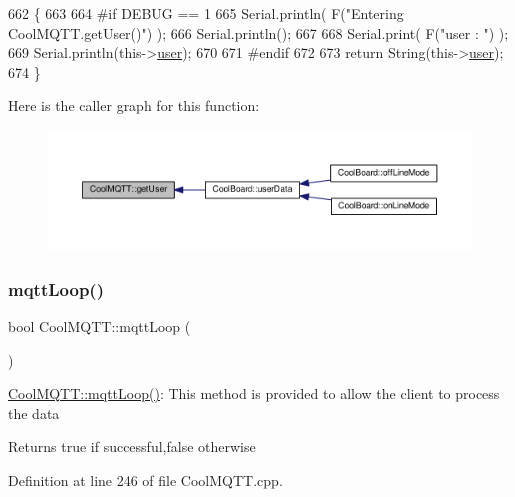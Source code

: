 \begin{DoxyCode}
662 \{
663 
664 \textcolor{preprocessor}{#if DEBUG == 1 }
665     Serial.println( F(\textcolor{stringliteral}{"Entering CoolMQTT.getUser()"}) );
666     Serial.println();
667     
668     Serial.print( F(\textcolor{stringliteral}{"user : "}) );
669     Serial.println(this->\hyperlink{classCoolMQTT_a8cd47e45d457f908d4b4390b35aaee83}{user});
670 
671 \textcolor{preprocessor}{#endif}
672 
673     \textcolor{keywordflow}{return} String(this->\hyperlink{classCoolMQTT_a8cd47e45d457f908d4b4390b35aaee83}{user});
674 \}
\end{DoxyCode}
Here is the caller graph for this function\+:\nopagebreak
\begin{figure}[H]
\begin{center}
\leavevmode
\includegraphics[width=350pt]{classCoolMQTT_a373cc92fca7760d886f02d8a6e5b3f63_icgraph}
\end{center}
\end{figure}
\mbox{\label{classCoolMQTT_aa5eaae967b562b62cbcf2b8d81f6e5d5}} 
\subsubsection{\texorpdfstring{mqtt\+Loop()}{mqttLoop()}}
{\footnotesize\ttfamily bool Cool\+M\+Q\+T\+T\+::mqtt\+Loop (\begin{DoxyParamCaption}{ }\end{DoxyParamCaption})}

\hyperlink{classCoolMQTT_aa5eaae967b562b62cbcf2b8d81f6e5d5}{Cool\+M\+Q\+T\+T\+::mqtt\+Loop()}\+: This method is provided to allow the client to process the data

\begin{DoxyReturn}{Returns}
true if successful,false otherwise 
\end{DoxyReturn}


Definition at line 246 of file Cool\+M\+Q\+T\+T.\+cpp.



